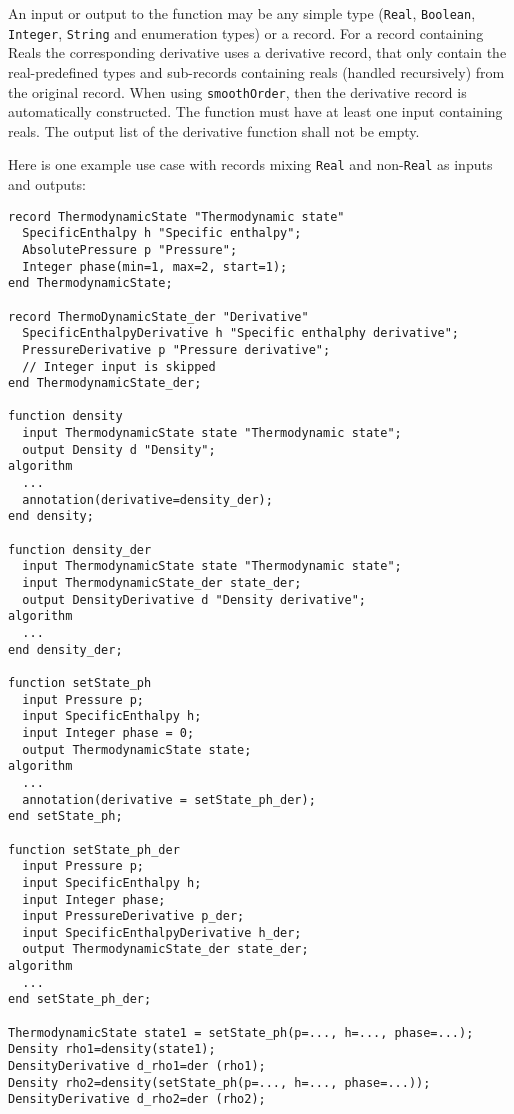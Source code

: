An input or output to the function may be any simple type (\lstinline!Real!, \lstinline!Boolean!, \lstinline!Integer!, \lstinline!String! and enumeration types) or a record.  For a record containing Reals the corresponding derivative uses a derivative record, that only contain the real-predefined types and sub-records containing reals (handled recursively) from the original record.  When using \lstinline!smoothOrder!, then the derivative record is automatically constructed.  The function must have at least one input containing reals.  The output list of the derivative function shall not be empty.

\begin{example}
Here is one example use case with records mixing \lstinline!Real! and
non-\lstinline!Real! as inputs and outputs:
\begin{lstlisting}[language=modelica]
record ThermodynamicState "Thermodynamic state"
  SpecificEnthalpy h "Specific enthalpy";
  AbsolutePressure p "Pressure";
  Integer phase(min=1, max=2, start=1);
end ThermodynamicState;

record ThermoDynamicState_der "Derivative"
  SpecificEnthalpyDerivative h "Specific enthalphy derivative";
  PressureDerivative p "Pressure derivative";
  // Integer input is skipped
end ThermodynamicState_der;

function density
  input ThermodynamicState state "Thermodynamic state";
  output Density d "Density";
algorithm
  ...
  annotation(derivative=density_der);
end density;

function density_der
  input ThermodynamicState state "Thermodynamic state";
  input ThermodynamicState_der state_der;
  output DensityDerivative d "Density derivative";
algorithm
  ...
end density_der;

function setState_ph
  input Pressure p;
  input SpecificEnthalpy h;
  input Integer phase = 0;
  output ThermodynamicState state;
algorithm
  ...
  annotation(derivative = setState_ph_der);
end setState_ph;

function setState_ph_der
  input Pressure p;
  input SpecificEnthalpy h;
  input Integer phase;
  input PressureDerivative p_der;
  input SpecificEnthalpyDerivative h_der;
  output ThermodynamicState_der state_der;
algorithm
  ...
end setState_ph_der;

ThermodynamicState state1 = setState_ph(p=..., h=..., phase=...);
Density rho1=density(state1);
DensityDerivative d_rho1=der (rho1);
Density rho2=density(setState_ph(p=..., h=..., phase=...));
DensityDerivative d_rho2=der (rho2);
\end{lstlisting}
\end{example}

